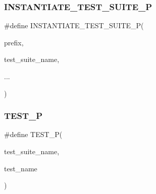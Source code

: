 \subsubsection{\texorpdfstring{I\+N\+S\+T\+A\+N\+T\+I\+A\+T\+E\+\_\+\+T\+E\+S\+T\+\_\+\+S\+U\+I\+T\+E\+\_\+P}{INSTANTIATE\_TEST\_SUITE\_P}}
{\footnotesize\ttfamily \#define I\+N\+S\+T\+A\+N\+T\+I\+A\+T\+E\+\_\+\+T\+E\+S\+T\+\_\+\+S\+U\+I\+T\+E\+\_\+P(\begin{DoxyParamCaption}\item[{}]{prefix,  }\item[{}]{test\+\_\+suite\+\_\+name,  }\item[{}]{... }\end{DoxyParamCaption})}

\mbox{\label{gtest-param-test_8h_a1adc861b311e3fbd97bcc72e0b0f5962}} 
\subsubsection{\texorpdfstring{T\+E\+S\+T\+\_\+P}{TEST\_P}}
{\footnotesize\ttfamily \#define T\+E\+S\+T\+\_\+P(\begin{DoxyParamCaption}\item[{}]{test\+\_\+suite\+\_\+name,  }\item[{}]{test\+\_\+name }\end{DoxyParamCaption})}

